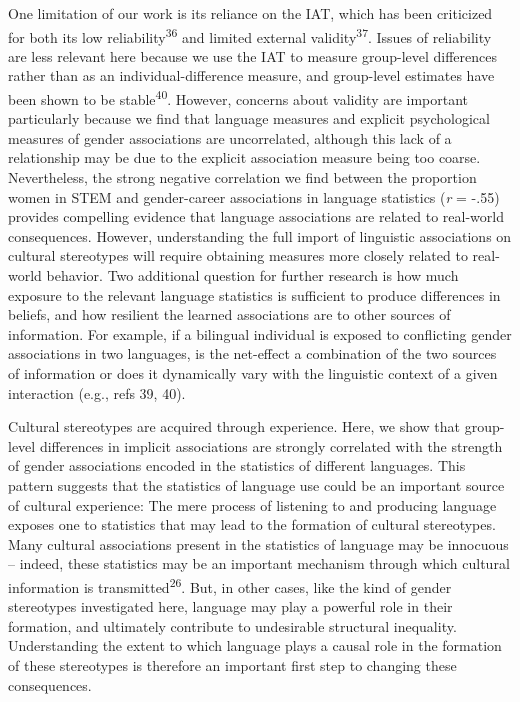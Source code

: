 \documentclass[9pt,twocolumn]{pnas-new}
\begin{document}
One limitation of our work is its reliance on the IAT, which has been criticized for both its low reliability\textsuperscript{36} and limited external validity\textsuperscript{37}. Issues of reliability are less relevant here because we use the IAT to measure group-level differences rather than as an individual-difference measure, and group-level estimates have been shown to be stable\textsuperscript{40}. However, concerns about validity are important particularly because we find that language measures and explicit psychological measures of gender associations are uncorrelated, although this lack of a relationship may be due to the explicit association measure being too coarse. Nevertheless, the strong negative correlation we find between the proportion women in STEM and gender-career associations in language statistics (\emph{r} = -.55) provides compelling evidence that language associations are related to real-world consequences. However, understanding the full import of linguistic associations on cultural stereotypes will require obtaining measures more closely related to real-world behavior. Two additional question for further research is how much exposure to the relevant language statistics is sufficient to produce differences in beliefs, and how resilient the learned associations are to other sources of information. For example, if a bilingual individual is exposed to conflicting gender associations in two languages, is the net-effect a combination of the two sources of information or does it dynamically vary with the linguistic context of a given interaction (e.g., refs 39, 40).


Cultural stereotypes are acquired through experience. Here, we show that
group-level differences in implicit associations are strongly correlated with the strength of gender associations encoded in the statistics of different languages. This pattern suggests that the statistics of language use could be an important source of cultural experience: The mere process of
listening to and producing language exposes one to statistics that may
lead to the formation of cultural stereotypes. Many cultural
associations present in the statistics of language may be innocuous --
indeed, these statistics may be an important mechanism through which
cultural information is transmitted\textsuperscript{26}. But, in
other cases, like the kind of gender stereotypes investigated here,
language may play a powerful role in their formation, and ultimately
contribute to undesirable structural inequality. Understanding the extent to which language plays a causal role in the formation of these stereotypes is therefore an important first step to changing these consequences.
\end{document}
